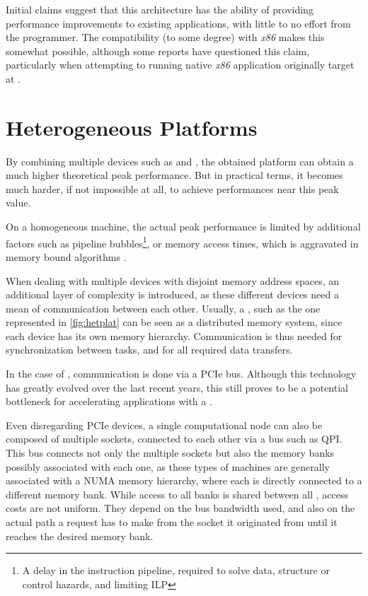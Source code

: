 \documentclass[main.tex]{subfiles}
\begin{document}
Initial claims suggest that this architecture has the ability of providing performance improvements to existing applications, with little to no effort from the programmer. The compatibility (to some degree) with \textit{x86} makes this somewhat possible, although some reports have questioned this claim, particularly when attempting to running native \textit{x86} application originally target at \xeon \cpus\cite{MIC:Nvidia}.


\section{Heterogeneous Platforms}

By combining multiple devices such as \cpus and \gpus, the obtained platform can obtain a much higher theoretical peak performance. But in practical terms, it becomes much harder, if not impossible at all, to achieve performances near this peak value.

On a homogeneous machine, the actual peak performance is limited by additional factors such as pipeline bubbles\footnote{A delay in the instruction pipeline, required to solve data, structure or control hazards, and limiting \ac{ILP} }, or memory access times, which is aggravated in memory bound algorithms \cite{williams2009roofline}.

When dealing with multiple devices with disjoint memory address spaces, an additional layer of complexity is introduced, as these different devices need a mean of communication between each other. Usually, a \hetplat, such as the one represented in \cref{fig:hetplat} can be seen as a distributed memory system, since each device has its own memory hierarchy. Communication is thus needed for synchronization between tasks, and for all required data transfers.


In the case of \gpus, communication is done via a \acs{PCIe} bus. Although this technology has greatly evolved over the last recent years, this still proves to be a potential bottleneck for accelerating applications with a \gpu.

Even disregarding \acs{PCIe} devices, a single computational node can also be composed of multiple \cpu sockets, connected to each other via a bus such as \ac{QPI}. This bus connects not only the multiple sockets but also the memory banks possibly associated with each one, as these types of machines are generally associated with a \acs{NUMA} memory hierarchy, where each \cpu is directly connected to a different memory bank. While access to all banks is shared between all \cpus, access costs are not uniform. They depend on the bus bandwidth used, and also on the actual path a request has to make from the socket it originated from until it reaches the desired memory bank.
\end{document}
